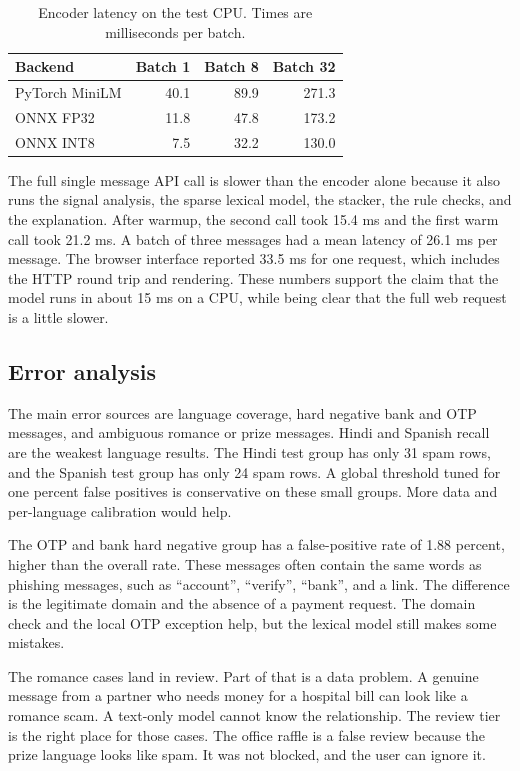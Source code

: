 \documentclass[11pt]{article}
\begin{document}
\begin{table}[htbp]
\centering
\small
\caption{Encoder latency on the test CPU. Times are milliseconds per batch.}
\label{tab:latency}
\begin{tabular}{lrrr}
\toprule
Backend & Batch 1 & Batch 8 & Batch 32 \\
\midrule
PyTorch MiniLM & 40.1 & 89.9 & 271.3 \\
ONNX FP32 & 11.8 & 47.8 & 173.2 \\
ONNX INT8 & 7.5 & 32.2 & 130.0 \\
\bottomrule
\end{tabular}
\end{table}

The full single message API call is slower than the encoder alone because it also runs the signal analysis, the sparse lexical model, the stacker, the rule checks, and the explanation. After warmup, the second call took 15.4 ms and the first warm call took 21.2 ms. A batch of three messages had a mean latency of 26.1 ms per message. The browser interface reported 33.5 ms for one request, which includes the HTTP round trip and rendering. These numbers support the claim that the model runs in about 15 ms on a CPU, while being clear that the full web request is a little slower.

\subsection{Error analysis}

The main error sources are language coverage, hard negative bank and OTP messages, and ambiguous romance or prize messages. Hindi and Spanish recall are the weakest language results. The Hindi test group has only 31 spam rows, and the Spanish test group has only 24 spam rows. A global threshold tuned for one percent false positives is conservative on these small groups. More data and per-language calibration would help.

The OTP and bank hard negative group has a false-positive rate of 1.88 percent, higher than the overall rate. These messages often contain the same words as phishing messages, such as ``account'', ``verify'', ``bank'', and a link. The difference is the legitimate domain and the absence of a payment request. The domain check and the local OTP exception help, but the lexical model still makes some mistakes.

The romance cases land in review. Part of that is a data problem. A genuine message from a partner who needs money for a hospital bill can look like a romance scam. A text-only model cannot know the relationship. The review tier is the right place for those cases. The office raffle is a false review because the prize language looks like spam. It was not blocked, and the user can ignore it.
\end{document}
